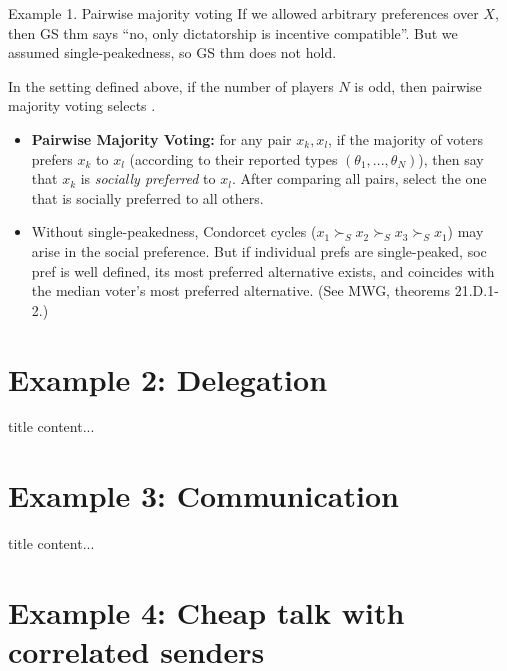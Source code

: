 \documentclass[english,10pt
,aspectratio=169
]{beamer}
\begin{document}
\begin{frame}{Example 1. Pairwise majority voting}
	If we allowed arbitrary preferences over $X$, then GS thm says ``no, only dictatorship is incentive compatible''. But we assumed single-peakedness, so GS thm does not hold.
	\begin{theorem}
		In the setting defined above, if the number of players $N$ is odd, then \alert{pairwise majority voting} selects .
	\end{theorem}
	\begin{itemize}
		\item \textbf{Pairwise Majority Voting:} for any pair $x_k, x_l$, if the majority of voters prefers $x_k$ to $x_l$ (according to their reported types $(\theta_1,...,\theta_N)$), then say that $x_k$ is \emph{socially preferred} to $x_l$. After comparing all pairs, select the one that is socially preferred to all others.
		\item Without single-peakedness, Condorcet cycles ($x_1 \succ_S x_2 \succ_S x_3 \succ_S x_1$) may arise in the social preference. But if individual prefs are single-peaked, soc pref is well defined, its most preferred alternative exists, and coincides with the median voter's most preferred alternative. (See MWG, theorems 21.D.1-2.)
	\end{itemize}
\end{frame}



\section{Example 2: Delegation}

\begin{frame}{title}
content...
\end{frame}



\section{Example 3: Communication}

\begin{frame}{title}
	content...
\end{frame}


\section{Example 4: Cheap talk with correlated senders}
\end{document}

